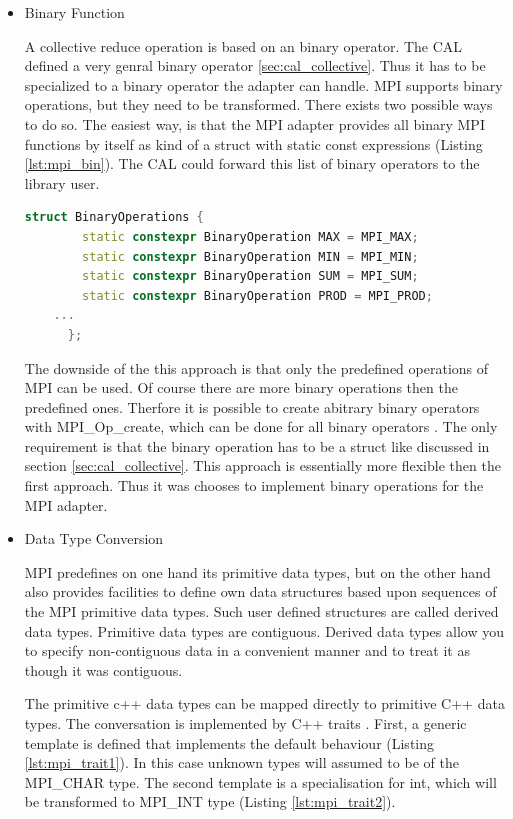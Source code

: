   \begin{itemize}
  \item Binary Function

    A collective reduce operation is based on an binary operator. The
    CAL defined a very genral binary operator
    \ref{sec:cal_collective}. Thus it has to be specialized to a
    binary operator the adapter can handle. MPI supports binary
    operations, but they need to be transformed.  There exists two
    possible ways to do so. The easiest way, is that the MPI adapter
    provides all binary MPI functions by itself as kind of a struct
    with static const expressions (Listing \ref{lst:mpi_bin}). The CAL
    could forward this list of binary operators to the library user.

    \begin{lstlisting}[language=C++, caption={Binary operators by static constexpr.}, label=lst:mpi_bin]
      struct BinaryOperations { 	
        static constexpr BinaryOperation MAX = MPI_MAX; 	
        static constexpr BinaryOperation MIN = MPI_MIN; 	
        static constexpr BinaryOperation SUM = MPI_SUM; 	
        static constexpr BinaryOperation PROD = MPI_PROD;
	...
      };
    \end{lstlisting}

    The downside of the this approach is that only the predefined
    operations of MPI can be used. Of course there are more binary
    operations then the predefined ones. Therfore it is possible to
    create abitrary binary operators with MPI\_Op\_create, which can
    be done for all binary operators . The only requirement is that
    the binary operation has to be a struct like discussed in section
    \ref{sec:cal_collective}. This approach is essentially more flexible
    then the first approach. Thus it was chooses to implement binary
    operations for the MPI adapter.

  \item  Data Type Conversion 

    MPI predefines on one hand its primitive data types, but on the
    other hand also provides facilities to define own data structures
    based upon sequences of the MPI primitive data types. Such user
    defined structures are called derived data types. Primitive data
    types are contiguous. Derived data types allow you to specify
    non-contiguous data in a convenient manner and to treat it as
    though it was contiguous.

    The primitive c++ data types can be mapped directly to primitive
    C++ data types. The conversation is implemented by C++ traits .
    First, a generic template is defined that implements the default
    behaviour (Listing \ref{lst:mpi_trait1}). In this case unknown
    types will assumed to be of the MPI\_CHAR type. The second
    template is a specialisation for int, which will be transformed to
    MPI\_INT type (Listing \ref{lst:mpi_trait2}).



\end{itemize}
